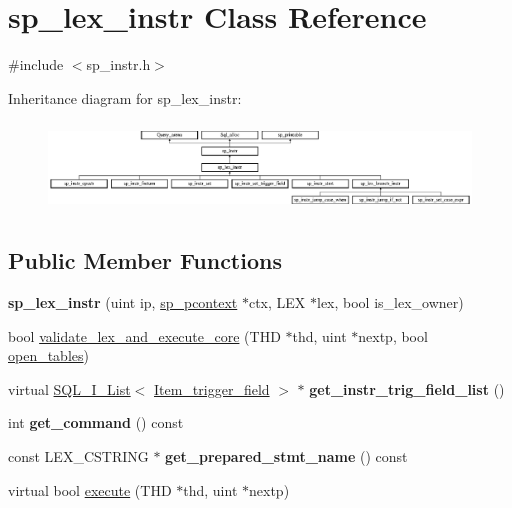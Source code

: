 \hypertarget{classsp__lex__instr}{}\section{sp\+\_\+lex\+\_\+instr Class Reference}
\label{classsp__lex__instr}


{\ttfamily \#include $<$sp\+\_\+instr.\+h$>$}

Inheritance diagram for sp\+\_\+lex\+\_\+instr\+:\begin{figure}[H]
\begin{center}
\leavevmode
\includegraphics[height=2.380952cm]{classsp__lex__instr}
\end{center}
\end{figure}
\subsection*{Public Member Functions}
\begin{DoxyCompactItemize}
\item 
\mbox{\label{classsp__lex__instr_af19389f29a546a0eeab0a5d46990d38b}} 
{\bfseries sp\+\_\+lex\+\_\+instr} (uint ip, \mbox{\hyperlink{classsp__pcontext}{sp\+\_\+pcontext}} $\ast$ctx, L\+EX $\ast$lex, bool is\+\_\+lex\+\_\+owner)
\item 
bool \mbox{\hyperlink{classsp__lex__instr_a9991350aa928258ec9b2c73c8167d87e}{validate\+\_\+lex\+\_\+and\+\_\+execute\+\_\+core}} (T\+HD $\ast$thd, uint $\ast$nextp, bool \mbox{\hyperlink{group__Data__Dictionary_ga59e488af7a3f47be08fad22370de07c5}{open\+\_\+tables}})
\item 
\mbox{\label{classsp__lex__instr_a7f79f395f560ec802969364a52f643d9}} 
virtual \mbox{\hyperlink{classSQL__I__List}{S\+Q\+L\+\_\+\+I\+\_\+\+List}}$<$ \mbox{\hyperlink{classItem__trigger__field}{Item\+\_\+trigger\+\_\+field}} $>$ $\ast$ {\bfseries get\+\_\+instr\+\_\+trig\+\_\+field\+\_\+list} ()
\item 
\mbox{\label{classsp__lex__instr_adfabae5cbb6a5692e0b2c9dd4dbae4ba}} 
int {\bfseries get\+\_\+command} () const
\item 
\mbox{\label{classsp__lex__instr_aa69da274297fef193fcaf688658a2997}} 
const L\+E\+X\+\_\+\+C\+S\+T\+R\+I\+NG $\ast$ {\bfseries get\+\_\+prepared\+\_\+stmt\+\_\+name} () const
\item 
virtual bool \mbox{\hyperlink{classsp__lex__instr_a1cb4c51d92402e942d15ea95e57785dd}{execute}} (T\+HD $\ast$thd, uint $\ast$nextp)
\end{DoxyCompactItemize}
